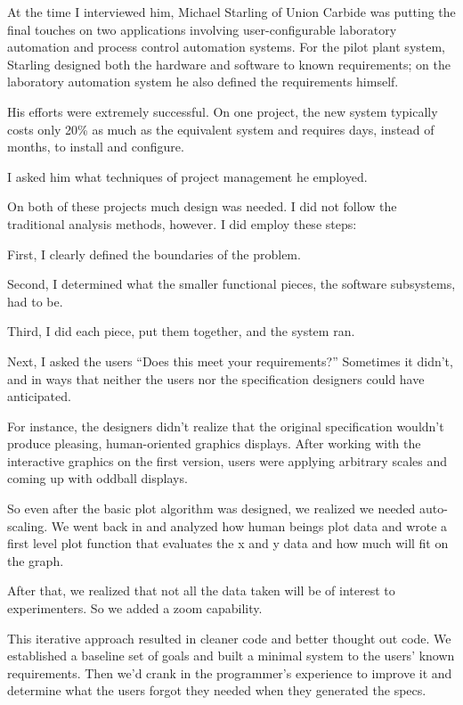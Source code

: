 \begin{interview}
\noindent At the time I interviewed him, Michael Starling of Union Carbide was
putting the final touches on two applications involving user-configurable
laboratory automation and process control automation systems. For the
pilot plant system, Starling designed both the hardware and software to
known requirements; on the laboratory automation system he also
defined the requirements himself.

His efforts were extremely successful. On one project, the new
system typically costs only 20\% as much as the equivalent system and
requires days, instead of months, to install and configure.

I asked him what techniques of project management he employed.

\begin{tfquot}
On both of these projects much design was needed. I did not follow the
traditional analysis methods, however. I did employ these steps:

First, I clearly defined the boundaries of the problem.

Second, I determined what the smaller functional pieces, the software
subsystems, had to be.

Third, I did each piece, put them together, and the system ran.

Next, I asked the users ``Does this meet your requirements?'' Sometimes it
didn't, and in ways that neither the users nor the specification designers
could have anticipated.

For instance, the designers didn't realize that the original
specification wouldn't produce pleasing, human-oriented graphics
displays. After working with the interactive graphics on the first
version, users were applying arbitrary scales and coming up with
oddball displays.

So even after the basic plot algorithm was designed, we realized we
needed auto-scaling. We went back in and analyzed how human beings
plot data and wrote a first level plot function that evaluates the x
and y data and how much will fit on the graph.

After that, we realized that not all the data taken will be of
interest to experimenters. So we added a zoom capability.

This iterative approach resulted in cleaner code and better thought
out code. We established a baseline set of goals and built a minimal
system to the users' known requirements. Then we'd crank in the
programmer's experience to improve it and determine what the users
forgot they needed when they generated the specs.


\end{tfquot}
\end{interview}
